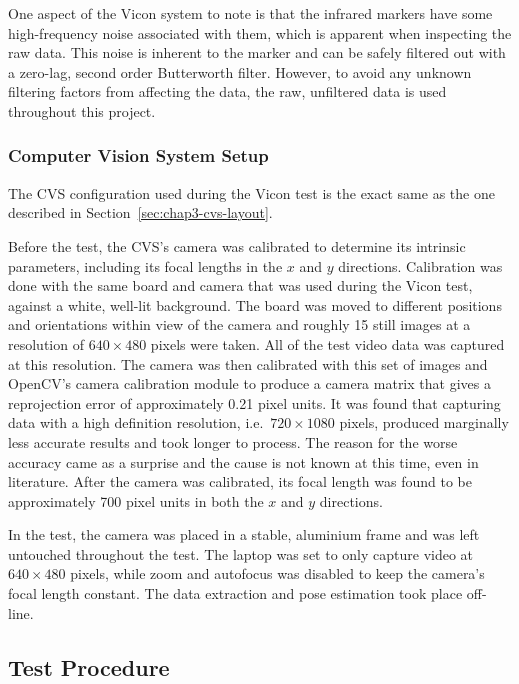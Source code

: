 One aspect of the Vicon system to note is that the infrared markers have some high-frequency noise associated with them, which is apparent when inspecting the raw data. This noise is inherent to the marker and can be safely filtered out with a zero-lag, second order Butterworth filter. However, to avoid any unknown filtering factors from affecting the data, the raw, unfiltered data is used throughout this project. 

\subsubsection{Computer Vision System Setup}

The CVS configuration used during the Vicon test is the exact same as the one described in Section~\ref{sec:chap3-cvs-layout}.

Before the test, the CVS's camera was calibrated to determine its intrinsic parameters, including its focal lengths in the $x$ and $y$ directions. Calibration was done with the same board and camera that was used during the Vicon test, against a white, well-lit background. The board was moved to different positions and orientations within view of the camera and roughly 15 still images at a resolution of $640\times480$ pixels were taken. All of the test video data was captured at this resolution. The camera was then calibrated with this set of images and OpenCV's camera calibration module to produce a camera matrix that gives a reprojection error of approximately 0.21 pixel units. It was found that capturing data with a high definition resolution, i.e.\ $720\times1080$ pixels, produced marginally less accurate results and took longer to process. The reason for the worse accuracy came as a surprise and the cause is not known at this time, even in literature. After the camera was calibrated, its focal length was found to be approximately 700 pixel units in both the $x$ and $y$ directions.

In the test, the camera was placed in a stable, aluminium frame and was left untouched throughout the test. The laptop was set to only capture video at $640\times480$ pixels, while zoom and autofocus was disabled to keep the camera's focal length constant. The data extraction and pose estimation took place off-line. 

\subsection{Test Procedure}

